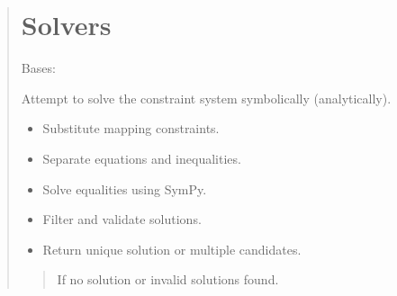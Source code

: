 \documentclass[letterpaper,10pt,english]{sphinxmanual}
\begin{document}
\begin{quote}
\chapter{Solvers}
\label{\detokenize{pygeox:module-pygeox.solver}}\label{\detokenize{pygeox:solvers}}

\begin{fulllineitems}
\label{\detokenize{pygeox:pygeox.solver.SolverNamespace}}
\pysigstartsignatures
\pysiglinewithargsret
{}
{}
{}
\pysigstopsignatures
\sphinxAtStartPar
Bases: 

\begin{fulllineitems}
\label{\detokenize{pygeox:pygeox.solver.SolverNamespace.analytical}}
\pysigstartsignatures
\pysiglinewithargsret
{}
{}
{}
\pysigstopsignatures
\sphinxAtStartPar
Attempt to solve the constraint system symbolically (analytically).
\begin{description}
\begin{itemize}
\item {} 
\sphinxAtStartPar
Substitute mapping constraints.

\item {} 
\sphinxAtStartPar
Separate equations and inequalities.

\item {} 
\sphinxAtStartPar
Solve equalities using SymPy.

\item {} 
\sphinxAtStartPar
Filter and validate solutions.

\item {} 
\sphinxAtStartPar
Return unique solution or multiple candidates.

\end{itemize}

\end{description}
\begin{quote}\begin{description}
\sphinxAtStartPar
{} \textendash{} If no solution or invalid solutions found.


\end{description}
\end{quote}
\end{fulllineitems}
\end{fulllineitems}
\end{quote}
\end{document}
